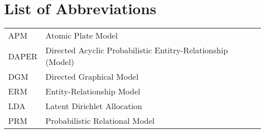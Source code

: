 \section*{List of Abbreviations}

\begin{tabular}{ll}
APM & Atomic Plate Model\\
DAPER & Directed Acyclic Probabilistic Entitry-Relationship (Model)\\
DGM & Directed Graphical Model\\
ERM & Entity-Relationship Model\\
LDA & Latent Dirichlet Allocation\\
PRM & Probabilistic Relational Model
\end{tabular}